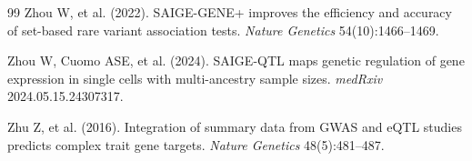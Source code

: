 \documentclass[11pt]{article}
\begin{document}
\begin{thebibliography}{99}
Zhou W, et al. (2022). SAIGE-GENE+ improves the efficiency and accuracy of set-based rare variant association tests. \emph{Nature Genetics} 54(10):1466--1469.

Zhou W, Cuomo ASE, et al. (2024). SAIGE-QTL maps genetic regulation of gene expression in single cells with multi-ancestry sample sizes. \emph{medRxiv} 2024.05.15.24307317.

Zhu Z, et al. (2016). Integration of summary data from GWAS and eQTL studies predicts complex trait gene targets. \emph{Nature Genetics} 48(5):481--487.

\end{thebibliography}
\end{document}
